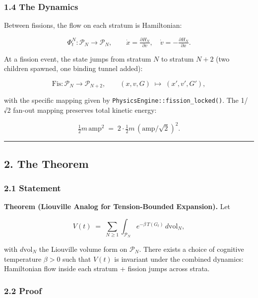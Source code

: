 \documentclass[
  11pt,
  a4paper,
]{article}
\begin{document}
\subsubsection{1.4 The Dynamics}\label{the-dynamics}

Between fissions, the flow on each stratum is Hamiltonian:

\[
\Phi_t^N: \mathcal{P}_N \to \mathcal{P}_N,
\qquad
\dot{x} = \tfrac{\partial H_N}{\partial v}, \quad
\dot{v} = -\tfrac{\partial H_N}{\partial x}.
\]

At a fission event, the state jumps from stratum \(N\) to stratum
\(N+2\) (two children spawned, one binding tunnel added):

\[
\text{Fis}: \mathcal{P}_N \to \mathcal{P}_{N+2},
\qquad
(x, v, G) \;\mapsto\; (x', v', G'),
\]

with the specific mapping given by
\texttt{PhysicsEngine::fission\_locked()}. The 1/√2 fan-out mapping
preserves total kinetic energy:

\[
\tfrac{1}{2} m \, \text{amp}^2 \;=\; 2 \cdot \tfrac{1}{2} m \, (\text{amp}/\sqrt{2})^2.
\]

\begin{center}\rule{0.5\linewidth}{0.5pt}\end{center}

\subsection{2. The Theorem}\label{the-theorem}

\subsubsection{2.1 Statement}\label{statement}

\textbf{Theorem (Liouville Analog for Tension-Bounded Expansion).} Let

\[
V(t) \;=\; \sum_{N \geq 1} \int_{\mathcal{P}_N} e^{-\beta \, T(G_t)} \, d\text{vol}_N,
\]

with \(d\text{vol}_N\) the Liouville volume form on \(\mathcal{P}_N\).
There exists a choice of cognitive temperature \(\beta > 0\) such that
\(V(t)\) is invariant under the combined dynamics: Hamiltonian flow
inside each stratum + fission jumps across strata.

\subsubsection{2.2 Proof}\label{proof}
\end{document}

